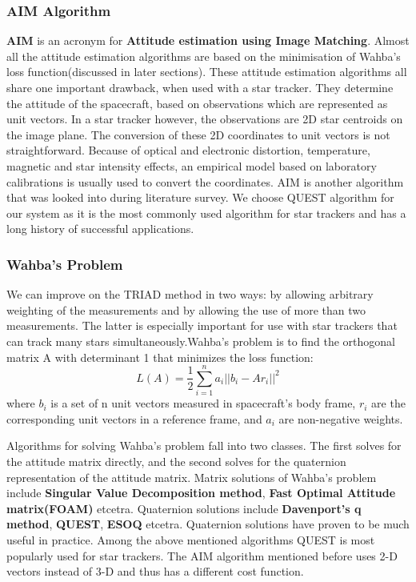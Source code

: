 \documentclass[../../main.tex]{subfiles}
\begin{document}
{{\subsubsection{AIM Algorithm}
\label{sec:AIM}
{
 \textbf{AIM} is an acronym for \textbf{Attitude estimation using Image Matching}.
Almost all the attitude estimation algorithms are based on the minimisation of Wahba's loss function(discussed in later sections). These attitude estimation algorithms all share one important drawback, when used with a star tracker. They
determine the attitude of the spacecraft, based on observations which are represented as unit vectors. In a
star tracker however, the observations are 2D star centroids on the image plane. The conversion of these 2D
coordinates to unit vectors is not straightforward. Because of optical and electronic distortion, temperature,
magnetic and star intensity effects, an empirical model based on laboratory calibrations is usually used
to convert the coordinates.\newline
AIM is another algorithm that was looked into during literature survey. We choose QUEST algorithm for our system as it is the most commonly used algorithm for star trackers and has a long history of successful applications. 

}


\subsubsection{Wahba's Problem}
{
We can improve on the TRIAD method in two ways: by allowing arbitrary weighting
of the measurements and by allowing the use of more than two measurements. The latter is especially important for use with star trackers that can track many stars simultaneously.Wahba’s problem is to find the orthogonal matrix A with determinant 1 that minimizes the loss function:
\begin{equation}
    L(A)=\frac{1}{2} \sum_{i=1}^{n}a_{i}||b_{i}-Ar_{i}||^2
\end{equation}
where $b_i$ is a set of n unit vectors measured in spacecraft's body frame, $r_i$ are the corresponding unit vectors in a reference frame, and $a_i$ are non-negative
weights.

Algorithms for solving Wahba’s problem fall into two classes. The first solves for the attitude matrix directly, and the second solves for the quaternion representation of the attitude matrix. Matrix solutions of Wahba's problem include \textbf{Singular Value Decomposition method}, \textbf{Fast Optimal Attitude matrix(FOAM)} etcetra. Quaternion solutions include \textbf{Davenport's q method}, \textbf{QUEST}, \textbf{ESOQ} etcetra. Quaternion solutions have proven to be much useful in practice. Among the above mentioned algorithms QUEST is most popularly used for star trackers. The AIM algorithm mentioned before uses 2-D vectors instead of 3-D and thus has a different cost function.

}}}
\end{document}
